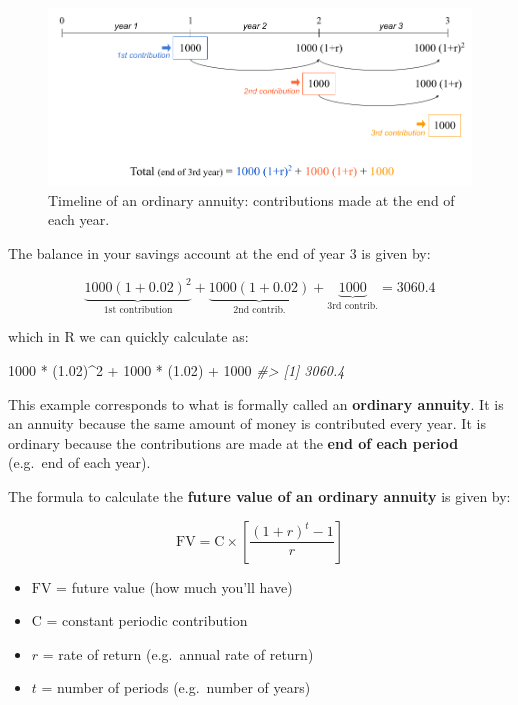 \documentclass[
]{book}
\newenvironment{Shaded}{\begin{snugshade}}{\end{snugshade}}
\newcommand{\CommentTok}[1]{\textcolor[rgb]{0.56,0.35,0.01}{\textit{#1}}}
\newcommand{\DecValTok}[1]{\textcolor[rgb]{0.00,0.00,0.81}{#1}}
\newcommand{\FloatTok}[1]{\textcolor[rgb]{0.00,0.00,0.81}{#1}}
\newcommand{\NormalTok}[1]{#1}
\newcommand{\SpecialCharTok}[1]{\textcolor[rgb]{0.00,0.00,0.00}{#1}}
\begin{document}
\begin{figure}

{\centering \includegraphics[width=0.95\linewidth]{images/conditionals/timeline-ord-annuity} 

}

\caption{Timeline of an ordinary annuity: contributions made at the end of each year.}\label{fig:unnamed-chunk-204}
\end{figure}

The balance in your savings account at the end of year 3 is given by:

\[
\underbrace{1000 (1 + 0.02)^2}_{\text{1st contribution}} + \underbrace{1000 (1 + 0.02)}_{\text{2nd contrib.}} + \underbrace{1000}_{\text{3rd contrib.}} = 3060.4
\]

which in R we can quickly calculate as:

\begin{Shaded}
\begin{Highlighting}[]
\DecValTok{1000} \SpecialCharTok{*}\NormalTok{ (}\FloatTok{1.02}\NormalTok{)}\SpecialCharTok{\^{}}\DecValTok{2} \SpecialCharTok{+} \DecValTok{1000} \SpecialCharTok{*}\NormalTok{ (}\FloatTok{1.02}\NormalTok{) }\SpecialCharTok{+} \DecValTok{1000}
\CommentTok{\#\textgreater{} [1] 3060.4}
\end{Highlighting}
\end{Shaded}

This example corresponds to what is formally called an \textbf{ordinary annuity}.
It is an annuity because the same amount of money is contributed every year.
It is ordinary because the contributions are made at the
\textbf{end of each period} (e.g.~end of each year).

The formula to calculate the \textbf{future value of an ordinary annuity} is given by:

\[
\text{FV} = \text{C} \times \left [ \frac{(1 + r)^t - 1}{r} \right]
\]

\begin{itemize}
\item
  \(\text{FV}\) = future value (how much you'll have)
\item
  \(\text{C}\) = constant periodic contribution
\item
  \(r\) = rate of return (e.g.~annual rate of return)
\item
  \(t\) = number of periods (e.g.~number of years)
\end{itemize}
\end{document}
